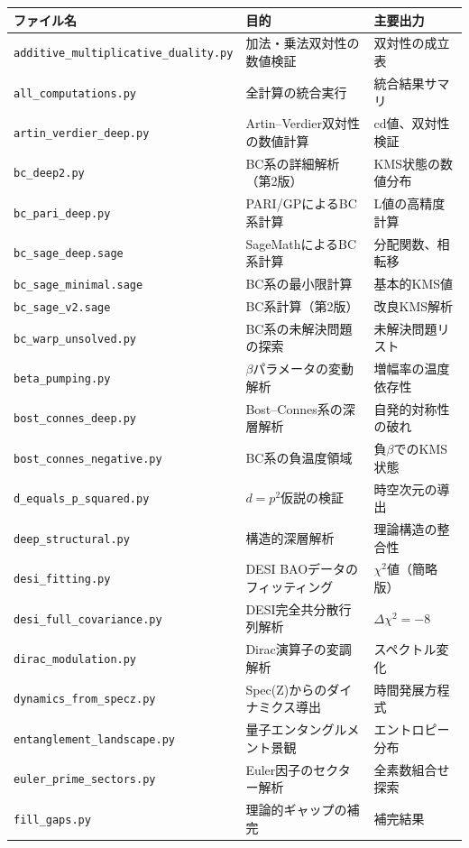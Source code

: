 \documentclass[11pt,a4paper]{article}
\begin{document}
\begin{longtable}{@{}p{5.5cm}p{5cm}p{4cm}@{}}
\toprule
\textbf{ファイル名} & \textbf{目的} & \textbf{主要出力} \\
\midrule
\endhead
\texttt{additive\_multiplicative\allowbreak \_duality.py} & 加法・乗法双対性の数値検証 & 双対性の成立表 \\
\texttt{all\_computations.py} & 全計算の統合実行 & 統合結果サマリ \\
\texttt{artin\_verdier\_deep.py} & Artin--Verdier双対性の数値計算 & cd値、双対性検証 \\
\texttt{bc\_deep2.py} & BC系の詳細解析（第2版） & KMS状態の数値分布 \\
\texttt{bc\_pari\_deep.py} & PARI/GPによるBC系計算 & L値の高精度計算 \\
\texttt{bc\_sage\_deep.sage} & SageMathによるBC系計算 & 分配関数、相転移 \\
\texttt{bc\_sage\_minimal.sage} & BC系の最小限計算 & 基本的KMS値 \\
\texttt{bc\_sage\_v2.sage} & BC系計算（第2版） & 改良KMS解析 \\
\texttt{bc\_warp\_unsolved.py} & BC系の未解決問題の探索 & 未解決問題リスト \\
\texttt{beta\_pumping.py} & $\beta$パラメータの変動解析 & 増幅率の温度依存性 \\
\texttt{bost\_connes\_deep.py} & Bost--Connes系の深層解析 & 自発的対称性の破れ \\
\texttt{bost\_connes\_negative.py} & BC系の負温度領域 & 負$\beta$でのKMS状態 \\
\texttt{d\_equals\_p\_squared.py} & $d = p^2$仮説の検証 & 時空次元の導出 \\
\texttt{deep\_structural.py} & 構造的深層解析 & 理論構造の整合性 \\
\texttt{desi\_fitting.py} & DESI BAOデータのフィッティング & $\chi^2$値（簡略版） \\
\texttt{desi\_full\_covariance.py} & DESI完全共分散行列解析 & $\Delta\chi^2 = -8$ \\
\texttt{dirac\_modulation.py} & Dirac演算子の変調解析 & スペクトル変化 \\
\texttt{dynamics\_from\_specz.py} & Spec(Z)からのダイナミクス導出 & 時間発展方程式 \\
\texttt{entanglement\_landscape.py} & 量子エンタングルメント景観 & エントロピー分布 \\
\texttt{euler\_prime\_sectors.py} & Euler因子のセクター解析 & 全素数組合せ探索 \\
\texttt{fill\_gaps.py} & 理論的ギャップの補完 & 補完結果 \\

\end{longtable}
\end{document}
